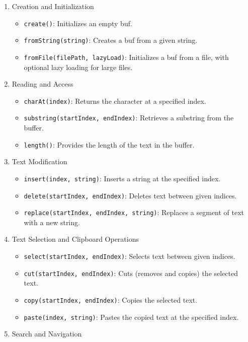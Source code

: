 \begin{enumerate}
\def\labelenumi{\arabic{enumi}.}
\item
  Creation and Initialization

  \begin{itemize}
  \tightlist
  \item
    \texttt{create()}: Initializes an empty buf.
  \item
    \texttt{fromString(string)}: Creates a buf from a given string.
  \item
    \texttt{fromFile(filePath,\ lazyLoad)}: Initializes a buf from a
    file, with optional lazy loading for large files.
  \end{itemize}
\item
  Reading and Access

  \begin{itemize}
  \tightlist
  \item
    \texttt{charAt(index)}: Returns the character at a specified index.
  \item
    \texttt{substring(startIndex,\ endIndex)}: Retrieves a substring
    from the buffer.
  \item
    \texttt{length()}: Provides the length of the text in the buffer.
  \end{itemize}
\item
  Text Modification

  \begin{itemize}
  \tightlist
  \item
    \texttt{insert(index,\ string)}: Inserts a string at the specified
    index.
  \item
    \texttt{delete(startIndex,\ endIndex)}: Deletes text between given
    indices.
  \item
    \texttt{replace(startIndex,\ endIndex,\ string)}: Replaces a segment
    of text with a new string.
  \end{itemize}
\item
  Text Selection and Clipboard Operations

  \begin{itemize}
  \tightlist
  \item
    \texttt{select(startIndex,\ endIndex)}: Selects text between given
    indices.
  \item
    \texttt{cut(startIndex,\ endIndex)}: Cuts (removes and copies) the
    selected text.
  \item
    \texttt{copy(startIndex,\ endIndex)}: Copies the selected text.
  \item
    \texttt{paste(index,\ string)}: Pastes the copied text at the
    specified index.
  \end{itemize}
\item
  Search and Navigation


\end{enumerate}
